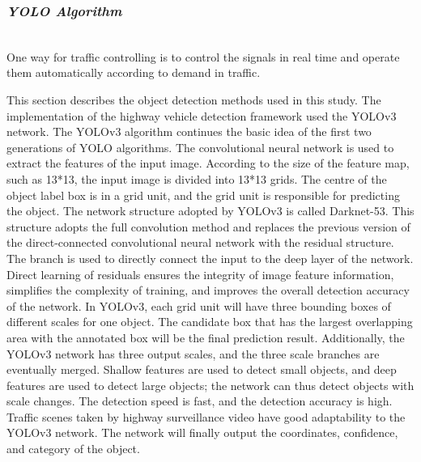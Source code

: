 \documentclass[12pt,a4paper,roman]{article}
\begin{document}
\subsubsection{\textit{YOLO Algorithm}}  
\\
 One way for traffic controlling is to control the signals in real time and operate them automatically according to demand in traffic.

\vspace{3mm}

This section describes the object detection methods used in this study. The implementation of the highway vehicle detection framework used the YOLOv3 network. The YOLOv3 algorithm continues the basic idea of the first two generations of YOLO algorithms. The convolutional neural network is used to extract the features of the input image. According to the size of the feature map, such as 13*13, the input image is divided into 13*13 grids. The centre of the object label box is in a grid unit, and the grid unit is responsible for predicting the object. The network structure adopted by YOLOv3 is called Darknet-53. This structure adopts the full convolution method and replaces the previous version of the direct-connected convolutional neural network with the residual structure. The branch is used to directly connect the input to the deep layer of the network. Direct learning of residuals ensures the integrity of image feature information, simplifies the complexity of training, and improves the overall detection accuracy of the network. In YOLOv3, each grid unit will have three bounding boxes of different scales for one object. The candidate box that has the largest overlapping area with the annotated box will be the final prediction result. Additionally, the YOLOv3 network has three output scales, and the three scale branches are eventually merged. Shallow features are used to detect small objects, and deep features are used to detect large objects; the network can thus detect objects with scale changes. The detection speed is fast, and the detection accuracy is high. Traffic scenes taken by highway surveillance video have good adaptability to the YOLOv3 network. The network will finally output the coordinates, confidence, and category of the object.

\vspace{3mm}
\end{document}
